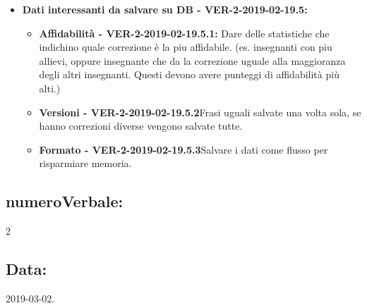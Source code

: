 \documentclass[a4paper, oneside, openany, dvipsnames, table]{article}
\begin{document}
\begin{itemize}
	\item \textbf{Dati interessanti da salvare su DB - VER-2-2019-02-19.5:}
	\begin{itemize}
		\item \textbf{Affidabilità - VER-2-2019-02-19.5.1:} Dare delle statistiche che indichino quale correzione è la piu affidabile.
		(es. insegnanti con piu allievi, oppure insegnante che da la correzione uguale alla maggioranza degli 
		altri insegnanti. Questi devono avere punteggi di affidabilità più alti.) 
		\item \textbf{Versioni - VER-2-2019-02-19.5.2}Frasi uguali salvate una volta sola, se hanno correzioni diverse vengono salvate tutte.
		\item \textbf{Formato - VER-2-2019-02-19.5.3}Salvare i dati come flusso per risparmiare memoria.
	\end{itemize}

\end{itemize}

\subsection{numeroVerbale:} 2

\subsection{Data:} 2019-03-02.
\end{document}
